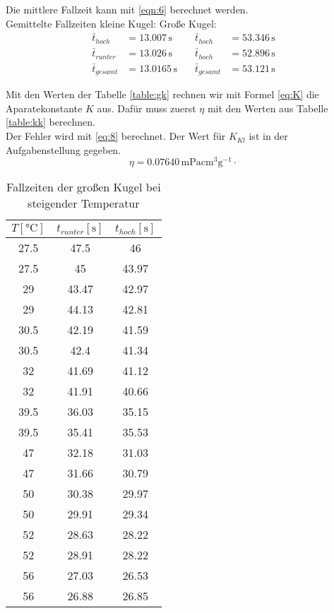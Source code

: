 Die mittlere Fallzeit kann mit \ref{eqn:6} berechnet werden.\\
Gemittelte Fallzeiten kleine Kugel: \qquad \qquad \qquad \qquad Große Kugel:
\begin{align}
  \bar{t}_{hoch} &= 13.007\,\unit{\second}  \quad &\bar{t}_{hoch} &= 53.346\,\unit{\second}\\
  \bar{t}_{runter} &= 13.026\,\unit{\second}  \quad &\bar{t}_{hoch} &= 52.896\,\unit{\second}\\
  \bar{t}_{gesamt} &= 13.0165\,\unit{\second}  \quad &\bar{t}_{gesamt} &= 53.121\,\unit{\second}
\end{align}

Mit den Werten der Tabelle \ref{table:gk} rechnen wir mit Formel \ref{eq:K}
die Aparatekonstante $K$ aus. Dafür muss zuerst $η$ mit den Werten aus Tabelle \ref{table:kk} berechnen.\\
Der Fehler wird mit \ref{eq:8} berechnet. Der Wert für $K_{Kl}$ ist in der Aufgabenstellung gegeben.\\
\begin{equation}
  η = 0.07640\,\mathrm{mPacm^3g^{-1}} \cdot 
\end{equation}



\begin{table}[!htp]
  \centering
  \begin{tabular}{|c|c|c|}
    \hline
    $T [\unit{\degreeCelsius}]$ & $t_{runter} [\unit{\second}]$ & $t_{hoch} [\unit{\second}]$\\
    \hline \hline
    27.5 & 47.5 & 46\\
    27.5 & 45 & 43.97\\
    29 & 43.47 & 42.97\\
    29 & 44.13 & 42.81\\
    30.5 & 42.19 & 41.59\\
    30.5 & 42.4 & 41.34\\
    32 & 41.69 & 41.12\\
    32 & 41.91 & 40.66\\
    39.5 & 36.03 & 35.15\\
    39.5 & 35.41 & 35.53\\
    47 & 32.18 & 31.03\\
    47 & 31.66 & 30.79\\
    50 & 30.38 & 29.97\\
    50 & 29.91 & 29.34\\
    52 & 28.63 & 28.22\\
    52 & 28.91 & 28.22\\
    56 & 27.03 & 26.53\\
    56 & 26.88 & 26.85\\
  \end{tabular}
  \label{tabellegkt}
  \caption{Fallzeiten der großen Kugel bei steigender Temperatur}
\end{table}


